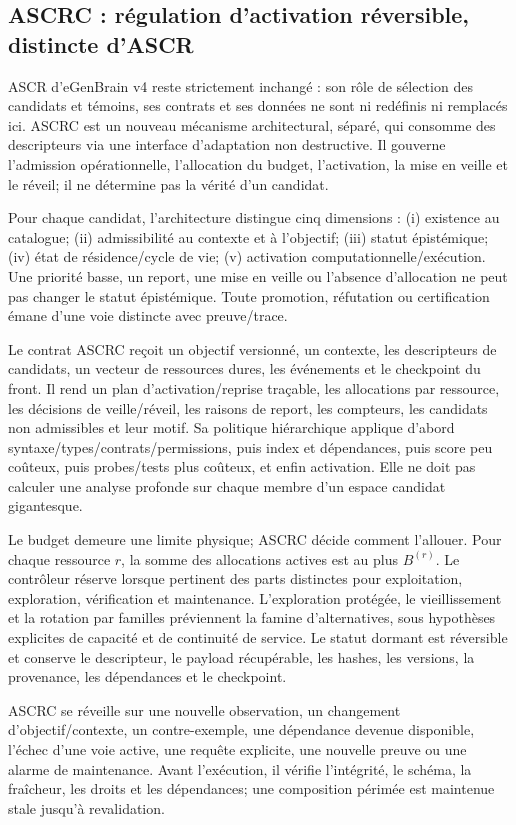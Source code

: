 \subsection{ASCRC : régulation d'activation réversible, distincte d'ASCR}
ASCR d'eGenBrain v4 reste strictement inchangé : son rôle de sélection des candidats et témoins, ses contrats et ses données ne sont ni redéfinis ni remplacés ici. ASCRC est un nouveau mécanisme architectural, séparé, qui consomme des descripteurs via une interface d'adaptation non destructive. Il gouverne l'admission opérationnelle, l'allocation du budget, l'activation, la mise en veille et le réveil; il ne détermine pas la vérité d'un candidat.

Pour chaque candidat, l'architecture distingue cinq dimensions : (i) existence au catalogue; (ii) admissibilité au contexte et à l'objectif; (iii) statut épistémique; (iv) état de résidence/cycle de vie; (v) activation computationnelle/exécution. Une priorité basse, un report, une mise en veille ou l'absence d'allocation ne peut pas changer le statut épistémique. Toute promotion, réfutation ou certification émane d'une voie distincte avec preuve/trace.

Le contrat ASCRC reçoit un objectif versionné, un contexte, les descripteurs de candidats, un vecteur de ressources dures, les événements et le checkpoint du front. Il rend un plan d'activation/reprise traçable, les allocations par ressource, les décisions de veille/réveil, les raisons de report, les compteurs, les candidats non admissibles et leur motif. Sa politique hiérarchique applique d'abord syntaxe/types/contrats/permissions, puis index et dépendances, puis score peu coûteux, puis probes/tests plus coûteux, et enfin activation. Elle ne doit pas calculer une analyse profonde sur chaque membre d'un espace candidat gigantesque.

Le budget demeure une limite physique; ASCRC décide comment l'allouer. Pour chaque ressource $r$, la somme des allocations actives est au plus $B^{(r)}$. Le contrôleur réserve lorsque pertinent des parts distinctes pour exploitation, exploration, vérification et maintenance. L'exploration protégée, le vieillissement et la rotation par familles préviennent la famine d'alternatives, sous hypothèses explicites de capacité et de continuité de service. Le statut dormant est réversible et conserve le descripteur, le payload récupérable, les hashes, les versions, la provenance, les dépendances et le checkpoint.

ASCRC se réveille sur une nouvelle observation, un changement d'objectif/contexte, un contre-exemple, une dépendance devenue disponible, l'échec d'une voie active, une requête explicite, une nouvelle preuve ou une alarme de maintenance. Avant l'exécution, il vérifie l'intégrité, le schéma, la fraîcheur, les droits et les dépendances; une composition périmée est maintenue stale jusqu'à revalidation.

